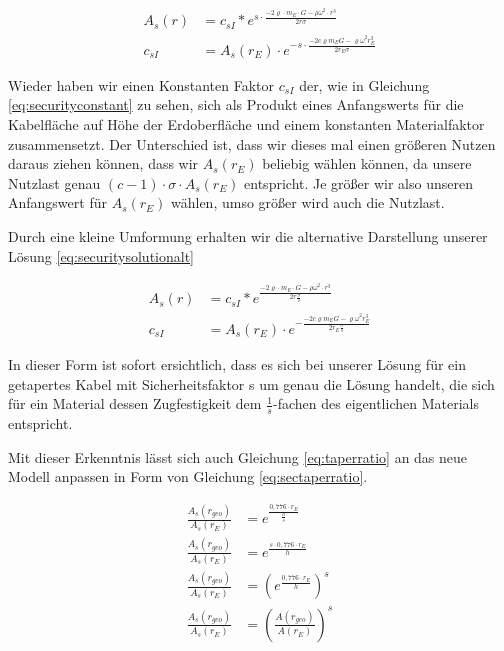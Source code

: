 \documentclass[a4paper, 10pt]{report}
\begin{document}
\begin{align}
A_s(r) &= c_{sI} * e^{s \cdot \frac{-2\varrho \cdot m_E \cdot G - \rho \omega^2 \cdot r^3}{2 r \sigma}}\label{eq:securitysolution}\\
c_{sI} &= A_s(r_E) \cdot e^{- s \cdot \frac{-2 c \varrho m_E G - \varrho \omega^2 r_E^3}{2 r_E \sigma}}
\label{eq:securityconstant}
\end{align}

Wieder haben wir einen Konstanten Faktor $c_{sI}$ der, wie in Gleichung \ref{eq:securityconstant} zu sehen, sich als Produkt eines Anfangswerts für die Kabelfläche auf Höhe der Erdoberfläche und einem konstanten Materialfaktor zusammensetzt. Der Unterschied ist, dass wir dieses mal einen größeren Nutzen daraus ziehen können, dass wir $A_s(r_E)$ beliebig wählen können, da unsere Nutzlast genau $(c-1)\cdot \sigma \cdot A_s(r_E)$ entspricht. Je größer wir also unseren Anfangswert für $A_s(r_E)$ wählen, umso größer wird auch die Nutzlast.

Durch eine kleine Umformung erhalten wir die alternative Darstellung unserer Lösung \ref{eq:securitysolutionalt}

\begin{align}
A_s(r) &= c_{sI} * e^{\frac{-2\varrho \cdot m_E \cdot G - \rho \omega^2 \cdot r^3}{2 r \frac{\sigma}{s}}}\label{eq:securitysolutionalt}\\
c_{sI} &= A_s(r_E) \cdot e^{- \frac{-2 c \varrho m_E G - \varrho \omega^2 r_E^3}{2 r_E \frac{\sigma}{s}}}
\label{eq:securityconstantalt}
\end{align}

In dieser Form ist sofort ersichtlich, dass es sich bei unserer Lösung für ein getapertes Kabel mit Sicherheitsfaktor s um genau die Lösung handelt, die sich für ein Material dessen Zugfestigkeit dem $\frac{1}{s}$-fachen des eigentlichen Materials entspricht.

Mit dieser Erkenntnis lässt sich auch Gleichung \ref{eq:taperratio} an das neue Modell anpassen in Form von Gleichung \ref{eq:sectaperratio}.

\begin{align}
\frac{A_s(r_{geo})}{A_s(r_E)} &= e^\frac{0,776 \cdot r_E}{\frac{h}{s}} \nonumber\\
\frac{A_s(r_{geo})}{A_s(r_E)} &= e^\frac{s \cdot 0,776 \cdot r_E}{h} \nonumber\\
\frac{A_s(r_{geo})}{A_s(r_E)} &= (e^\frac{0,776 \cdot r_E}{h})^s \nonumber\\
\frac{A_s(r_{geo})}{A_s(r_E)} &= (\frac{A(r_{geo})}{A(r_E)})^s
\label{eq:sectaperratio}
\end{align}
\end{document}
